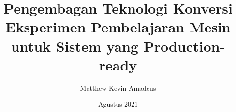 \title{Pengembagan Teknologi Konversi Eksperimen Pembelajaran Mesin untuk Sistem yang Production-ready}
\date{Agustus 2021}

\newcommand{\nim}{13518035}
\author{Matthew Kevin Amadeus}

\newcommand{\supervisor}{Achmad Imam Kistiantoro, S.T, M.Sc., Ph.D.}